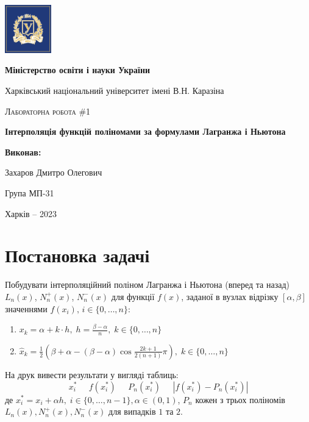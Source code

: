 \documentclass[12pt]{extarticle}
\begin{document}
\begin{titlepage}
	\centering
	\includegraphics[width=0.15\textwidth]{images/lab_1/logo.png}\par\vspace{0.3cm}
	{\textbf{Міністерство освіти і науки України}\par
 Харківський національний університет імені В.Н. Каразіна\par}
    \vspace{1cm}
	{\Large \textsc{Лабораторна робота \#1}\par
    \textbf{Інтерполяція функцій поліномами за формулами Лагранжа і Ньютона}\par}
	\vfill
 \begin{FlushRight}
	\textbf{Виконав:}\par Захаров Дмитро Олегович \par Група МП-31
\end{FlushRight}
	\vfill

	{\large Харків -- 2023\par}
\end{titlepage}

\tableofcontents
\pagebreak

\section{Постановка задачі}

Побудувати інтерполяційний поліном Лагранжа і Ньютона (вперед та назад) $L_n(x)$, $N_n^+(x)$, $N_n^{-}(x)$ для функції $f(x)$, заданої в вузлах відрізку $[\alpha,\beta]$ значеннями $f(x_i),\, i \in \{0,\dots,n\}$:
\begin{enumerate}
    \item $x_k = \alpha+k\cdot h, \; h = \frac{\beta-\alpha}{n}, \; k \in \{0,\dots,n\}$
    \item $\hat{x}_k = \frac{1}{2}\left(\beta+\alpha -(\beta-\alpha)\cos \frac{2k+1}{2(n+1)}\pi\right), \; k \in \{0,\dots,n\}$
\end{enumerate}

На друк вивести результати у вигляді таблиць:
\[
x_i^* \; \; \; \; \; f(x_i^*) \; \; \; \; \; P_n(x_i^*) \; \; \; \; \; |f(x_i^*) - P_n(x_i^*)|
\]
де $x_i^*=x_i+\alpha h, \; i \in \{0,\dots,n-1\}, \alpha \in (0,1)$, $P_n$ кожен з трьох поліномів $L_n(x),N_n^+(x),N_n^{-}(x)$ для випадків $1$ та $2$.
\end{document}
